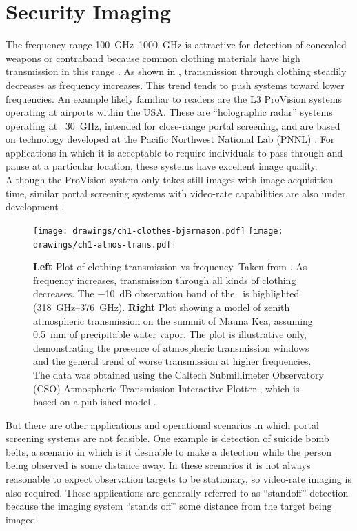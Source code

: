 \section{Security Imaging}

The frequency range \SIrange{100}{1000}{\GHz} is attractive for detection of concealed weapons or contraband because common clothing materials have high transmission in this range \cite{bjarnason_millimeter-wave_2004}.
As shown in , transmission through clothing steadily decreases as frequency increases.
This trend tends to push systems toward lower frequencies.
An example likely familiar to readers are the L3 ProVision systems operating at airports within the USA.
These are ``holographic radar'' systems operating at ~\SI{30}{\GHz}, intended for close-range portal screening, and are based on technology developed at the Pacific Northwest National Lab (PNNL) \cite{sheen_cylindrical_1998,mcmakin_dual-surface_2009}.
For applications in which it is acceptable to require individuals to pass through and pause at a particular location, these systems have excellent image quality.
Although the ProVision system only takes still images with  image acquisition time, similar portal screening systems with video-rate capabilities are also under development \cite{lyons_reflect-array_2013}.

\begin{figure}
\centering
\texttt{[image: drawings/ch1-clothes-bjarnason.pdf]}
\texttt{[image: drawings/ch1-atmos-trans.pdf]}
\caption[Clothing and Atmospheric Transmission vs Frequency]{
  \textbf{Left}
  Plot of clothing transmission vs frequency.
  Taken from \cite{bjarnason_millimeter-wave_2004}.
  As frequency increases, transmission through all kinds of clothing decreases.
  The \SI{-10}{\dB} observation band of the \Imager\ is highlighted (\SIrange{318}{376}{\GHz}).
  \textbf{Right}
  Plot showing a model of zenith atmospheric transmission on the summit of Mauna Kea, assuming \SI{0.5}{\mm} of precipitable water vapor.
  The plot is illustrative only, demonstrating the presence of atmospheric transmission windows and the general trend of worse transmission at higher frequencies.
  The data was obtained using the Caltech Submillimeter Observatory (CSO) Atmospheric Transmission Interactive Plotter \cite{darek_lis_cso_????}, which is based on a published model \cite{pardo_atmospheric_2001}.
}
\label{fig:ch1-clothes-atmos-trans}
\end{figure}

But there are other applications and operational scenarios in which portal screening systems are not feasible.
One example is detection of suicide bomb belts, a scenario in which is it desirable to make a detection while the person being observed is some distance away.
In these scenarios it is not always reasonable to expect observation targets to be stationary, so video-rate imaging is also required.
These applications are generally referred to as ``standoff'' detection because the imaging system ``stands off'' some distance from the target being imaged.

